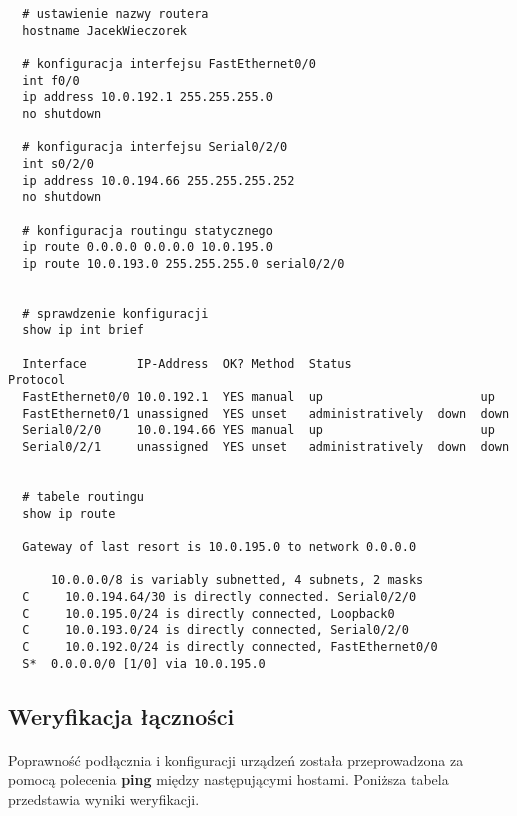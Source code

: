 \documentclass[wide,a4paper,titlepage,12pt] {article}
\begin{document}
  \begin{verbatim}
  # ustawienie nazwy routera
  hostname JacekWieczorek

  # konfiguracja interfejsu FastEthernet0/0
  int f0/0
  ip address 10.0.192.1 255.255.255.0
  no shutdown

  # konfiguracja interfejsu Serial0/2/0
  int s0/2/0
  ip address 10.0.194.66 255.255.255.252
  no shutdown

  # konfiguracja routingu statycznego
  ip route 0.0.0.0 0.0.0.0 10.0.195.0
  ip route 10.0.193.0 255.255.255.0 serial0/2/0


  # sprawdzenie konfiguracji
  show ip int brief

  Interface       IP-Address  OK? Method  Status                  Protocol
  FastEthernet0/0 10.0.192.1  YES manual  up                      up
  FastEthernet0/1 unassigned  YES unset   administratively  down  down
  Serial0/2/0     10.0.194.66 YES manual  up                      up
  Serial0/2/1     unassigned  YES unset   administratively  down  down


  # tabele routingu
  show ip route

  Gateway of last resort is 10.0.195.0 to network 0.0.0.0

      10.0.0.0/8 is variably subnetted, 4 subnets, 2 masks
  C     10.0.194.64/30 is directly connected. Serial0/2/0
  C     10.0.195.0/24 is directly connected, Loopback0
  C     10.0.193.0/24 is directly connected, Serial0/2/0
  C     10.0.192.0/24 is directly connected, FastEthernet0/0
  S*  0.0.0.0/0 [1/0] via 10.0.195.0
  \end{verbatim}



  \subsection{Weryfikacja łączności}
  \paragraph{}
  Poprawność podłącznia i konfiguracji urządzeń została przeprowadzona za pomocą polecenia \textbf{ping} między następującymi hostami. Poniższa tabela przedstawia wyniki weryfikacji.
\end{document}
